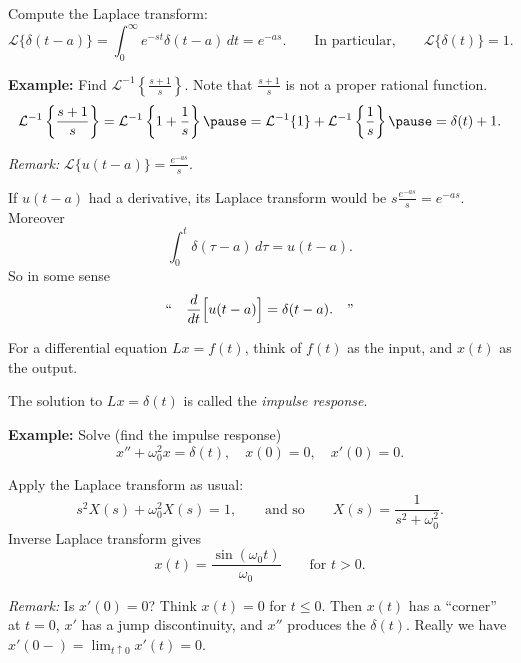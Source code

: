 \documentclass[10pt,aspectratio=169]{beamer}
\begin{document}
\begin{frame}
Compute the Laplace transform:
\[
{\mathcal{L}} \bigl\{ \delta(t-a) \bigr\}
=
\int_{0}^\infty e^{-st} \delta(t-a) \,dt = e^{-as} .
\qquad
\text{In particular,}
\qquad
{\mathcal{L}} \bigl\{ \delta(t) \bigr\} = 1 .
\]
\medskip
\pause

\textbf{Example:}
Find ${\mathcal{L}}^{-1} \left\{ \frac{s+1}{s} \right\}$.
Note that $\frac{s+1}{s}$ is not a proper rational function.
\pause
\[
{\mathcal{L}}^{-1} \left\{ \frac{s+1}{s} \right\}
=
{\mathcal{L}}^{-1} \left\{ 1 + \frac{1}{s} \right\}
\pause
=
{\mathcal{L}}^{-1} \{ 1 \}
+
{\mathcal{L}}^{-1} \left\{ \frac{1}{s} \right\}
\pause
=
\delta(t) + 1 .
\]

\pause

\emph{Remark:}
$
{\mathcal{L}} \bigl\{ u(t-a) \bigr\} = \frac{e^{-as}}{s}
$.

If $u(t-a)$ had a derivative,
its Laplace transform would be
\quad
$s \frac{e^{-as}}{s} = e^{-as}$.
\pause
Moreover
\[
\int_0^t \delta(\tau-a)\,d\tau = u(t-a) .
\]
\pause
So in some sense
\[
\text{``}
\quad \frac{d}{dt} \Bigl[ u(t-a) \Bigr] = \delta(t-a) . \quad
\text{''}
\]
\end{frame}

\begin{frame}
For a differential equation $L x = f(t)$,
think of $f(t)$ as the input, and $x(t)$ as the output.

\medskip
\pause

The solution to
\qquad
$
L x = \delta(t)
$
\qquad
is called the \emph{impulse response}.

\pause
\medskip

\textbf{Example:}
Solve (find the impulse response)
\[
x'' + \omega_0^2 x = \delta(t) , \quad x(0) = 0, \quad x'(0) = 0 .
\]

\pause
Apply the Laplace transform as usual:
\[
s^2 X(s) + \omega_0^2 X(s) = 1 ,
\qquad \text{and so} \qquad
X(s) = \frac{1}{s^2+ \omega_0^2} .
\]
\pause
Inverse Laplace transform gives
\[
x(t) = 
\frac{\sin (\omega_0 t)}{\omega_0} \qquad \text{for } t > 0 .
\]

\pause
\emph{Remark:}
Is $x'(0)=0$?
\pause
Think $x(t)=0$ for $t \leq 0$.
Then $x(t)$
has a ``corner'' at $t=0$,
$x'$ has a jump discontinuity,
and $x''$ produces the $\delta(t)$.
\pause
Really we have $x'(0-) = \lim_{t \uparrow 0} x'(t) = 0$.

\end{frame}
\end{document}
